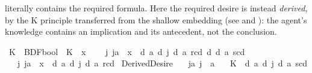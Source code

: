 \begin{isabellebody}
\begin{isamarkuptext}
literally contains the required formula. Here the required desire is instead
\emph{derived}, by the K principle transferred from the shallow embedding (see
 and ): the agent's knowledge contains an implication and its
antecedent, not the conclusion.%
\end{isamarkuptext}\isamarkuptrue%
\isamarkupfalse%
\ {\isasymGamma}\isactrlsub K\ {\isacharcolon}{\kern0pt}{\isacharcolon}{\kern0pt}\ {\isachardoublequoteopen}BDF{\isasymRightarrow}bool{\isachardoublequoteclose}\ \ {\isachardoublequoteopen}{\isasymGamma}\isactrlsub K\ {\isasymequiv}\ {\isasymlambda}x{\isachardot}{\kern0pt}\isanewline
\ \ \ \ {\isacharparenleft}{\kern0pt}{\isasymexists}j{\isachardot}{\kern0pt}\ j{\isasymnoteq}a\ {\isasymand}\ x\ {\isacharequal}{\kern0pt}\ {\isasymD}\isactrlsup d\ a\ {\isacharparenleft}{\kern0pt}{\isasymB}\isactrlsup d\ j\ {\isacharparenleft}{\kern0pt}{\isasymB}\isactrlsup d\ a\ {\isacharbraceleft}{\kern0pt}r\isactrlsup c{\isacharbraceright}{\kern0pt}\isactrlsup d\ {\isasymsupset}\isactrlsup d\ {\isasymB}\isactrlsup d\ a\ {\isacharbraceleft}{\kern0pt}s\isactrlsup c{\isacharbraceright}{\kern0pt}\isactrlsup d{\isacharparenright}{\kern0pt}{\isacharparenright}{\kern0pt}{\isacharparenright}{\kern0pt}\isanewline
\ \ {\isasymor}\ {\isacharparenleft}{\kern0pt}{\isasymexists}j{\isachardot}{\kern0pt}\ j{\isasymnoteq}a\ {\isasymand}\ x\ {\isacharequal}{\kern0pt}\ {\isasymD}\isactrlsup d\ a\ {\isacharparenleft}{\kern0pt}{\isasymB}\isactrlsup d\ j\ {\isacharparenleft}{\kern0pt}{\isasymB}\isactrlsup d\ a\ {\isacharbraceleft}{\kern0pt}r\isactrlsup c{\isacharbraceright}{\kern0pt}\isactrlsup d{\isacharparenright}{\kern0pt}{\isacharparenright}{\kern0pt}{\isacharparenright}{\kern0pt}{\isachardoublequoteclose}\isanewline
\isanewline
{}\isamarkupfalse%
\ DerivedDesire{\isacharcolon}{\kern0pt}\isanewline
\ \ \ ja{\isacharcolon}{\kern0pt}\ {\isachardoublequoteopen}j\ {\isasymnoteq}\ a{\isachardoublequoteclose}\isanewline
\ \ \ {\isachardoublequoteopen}{\isasymGamma}\isactrlsub K\ {\isasymTurnstile}\ {\isasymD}\isactrlsup d\ a\ {\isacharparenleft}{\kern0pt}{\isasymB}\isactrlsup d\ j\ {\isacharparenleft}{\kern0pt}{\isasymB}\isactrlsup d\ a\ {\isacharbraceleft}{\kern0pt}s\isactrlsup c{\isacharbraceright}{\kern0pt}\isactrlsup d{\isacharparenright}{\kern0pt}{\isacharparenright}{\kern0pt}{\isachardoublequoteclose}\isanewline
%
\isadelimproof
%
\endisadelimproof
%
\isatagproof
{}\isamarkupfalse%

\end{isabellebody}
